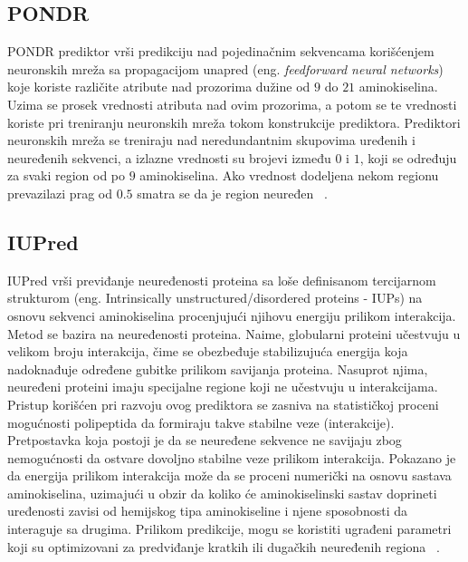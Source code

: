 \subsection{PONDR}
PONDR prediktor vrši predikciju nad pojedinačnim sekvencama korišćenjem neuronskih mreža sa propagacijom unapred (eng. \emph{feedforward neural networks}) koje koriste različite atribute nad prozorima dužine od $9$ do $21$ aminokiselina. Uzima se prosek vrednosti atributa nad ovim prozorima, a potom se te vrednosti koriste pri treniranju neuronskih mreža tokom konstrukcije prediktora. Prediktori neuronskih mreža se treniraju nad neredundantnim skupovima uređenih i neuređenih sekvenci, a izlazne vrednosti su brojevi između $0$ i $1$, koji se određuju za svaki region od po $9$ aminokiselina. Ako vrednost dodeljena nekom regionu prevazilazi prag od $0.5$ smatra se da je region neuređen ~\cite{pondr}.



\subsection{IUPred}
IUPred vrši previđanje neuređenosti proteina sa loše definisanom tercijarnom strukturom (eng. Intrinsically unstructured/disordered proteins - IUPs) na osnovu sekvenci aminokiselina procenjujući njihovu energiju prilikom interakcija. Metod se bazira na neuređenosti proteina. Naime, globularni proteini učestvuju u velikom broju interakcija, čime se obezbeđuje stabilizujuća energija koja nadoknađuje određene gubitke prilikom savijanja proteina. Nasuprot njima, neuređeni proteini imaju specijalne regione koji ne učestvuju u   interakcijama.\\

Pristup korišćen pri razvoju ovog prediktora se zasniva na statističkoj proceni mogućnosti polipeptida da formiraju takve stabilne veze (interakcije). Pretpostavka koja postoji je da se neuređene sekvence ne savijaju zbog nemogućnosti da ostvare dovoljno stabilne veze prilikom interakcija. Pokazano  je da energija prilikom interakcija može da se proceni numerički na osnovu sastava aminokiselina, uzimajući u obzir da koliko će aminokiselinski sastav doprineti uređenosti zavisi od hemijskog tipa aminokiseline i njene sposobnosti da interaguje sa drugima. Prilikom predikcije, mogu se koristiti ugrađeni parametri koji su optimizovani za predviđanje kratkih ili dugačkih neuređenih regiona ~\cite{IUPred, IUPred1, IUPred2, IUPred3}.
%
